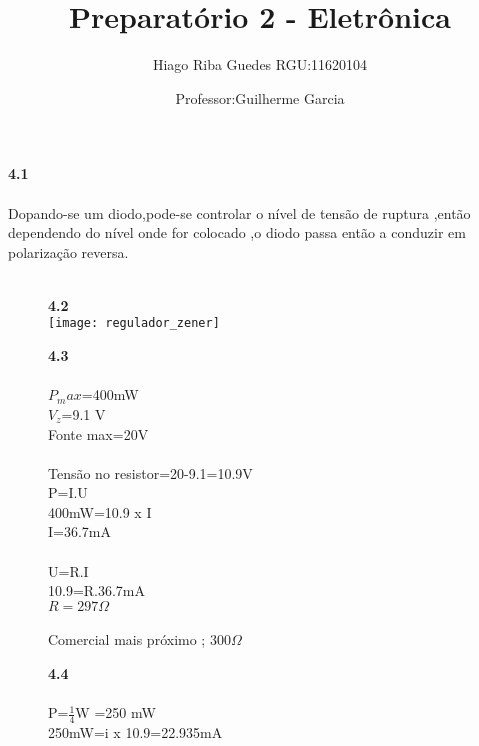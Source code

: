 \documentclass[11pt,a4paper]{article}
\title{Preparatório 2 - Eletrônica}
\author{Hiago Riba Guedes RGU:11620104}
\date{Professor:Guilherme Garcia}
\begin{document}
\maketitle
\textbf{4.1}\\\\
Dopando-se um diodo,pode-se controlar o nível de tensão de ruptura ,então dependendo do nível onde for colocado ,o diodo passa então a conduzir em polarização reversa.\\\\
\begin{figure}[!htb]
\textbf{4.2}\\
\texttt{[image: regulador\_zener]}
\end{figure}

\begin{figure}[!htb]
\textbf{4.3}\\\\
$P_max$=400mW\\
$V_z$=9.1 V\\
Fonte max=20V\\
\\
Tensão no resistor=20-9.1=10.9V\\
P=I.U\\
400mW=10.9 x I\\
I=36.7mA\\\\
U=R.I\\
10.9=R.36.7mA\\
$R=297\Omega$\\\\
Comercial mais próximo ; 300$\Omega$
\end{figure}

\begin{figure}[!htb]
\textbf{4.4}\\\\
P=$\frac{1}{4}$W =250 mW\\
250mW=i x 10.9=22.935mA\\


\end{figure}
\end{document}
